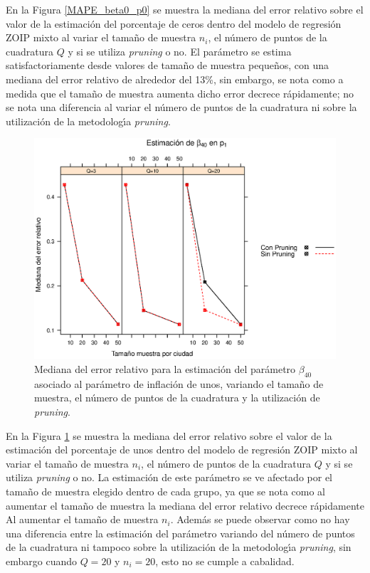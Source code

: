 En la Figura \ref{MAPE_beta0_p0} se muestra la mediana del error relativo sobre el valor de la estimaci\'{o}n del porcentaje de ceros dentro del modelo de regresi\'{o}n ZOIP mixto al variar el tama\~{n}o de muestra $n_i$, el n\'{u}mero de puntos de la cuadratura $Q$ y si se utiliza \textit{pruning} o no. El par\'{a}metro se estima satisfactoriamente desde valores de tama\~{n}o de muestra peque\~{n}os, con una mediana del error relativo de alrededor del 13\%, sin embargo, se nota como a medida que el tama\~{n}o de muestra aumenta dicho error decrece r\'{a}pidamente; no se nota una diferencia al variar el n\'{u}mero de puntos de la cuadratura ni sobre la utilizaci\'{o}n de la metodolog\'{\i}a \textit{pruning}.\\

\begin{figure}
	\begin{center}
		\includegraphics[scale=0.6]{MAPE_beta0_p1.eps}	
		\caption{Mediana del error relativo para la estimaci\'{o}n del par\'{a}metro $\beta_{40}$ asociado al par\'{a}metro de inflaci\'{o}n de unos, variando el tama\~{n}o de muestra, el n\'{u}mero de puntos de la cuadratura y la utilizaci\'{o}n de \textit{pruning}.}
		\label{MAPE_beta0_p1}
	\end{center}
\end{figure}

En la Figura \ref{MAPE_beta0_p1} se muestra la mediana del error relativo sobre el valor de la estimaci\'{o}n del porcentaje de unos dentro del modelo de regresi\'{o}n ZOIP mixto al variar el tama\~{n}o de muestra $n_i$, el n\'{u}mero de puntos de la cuadratura $Q$ y si se utiliza \textit{pruning} o no. La estimaci\'{o}n de este par\'{a}metro se ve afectado por el tama\~{n}o de muestra elegido dentro de cada grupo, ya que se nota como al aumentar el tama\~{n}o de muestra la mediana del error relativo decrece r\'{a}pidamente Al aumentar el tama\~{n}o de muestra $n_i$. Adem\'{a}s se puede observar como no hay una diferencia entre la estimaci\'{o}n del par\'{a}metro variando del n\'{u}mero de puntos de la cuadratura ni tampoco sobre la utilizaci\'{o}n de la metodolog\'{\i}a \textit{pruning}, sin embargo cuando $Q=20$ y $n_i=20$, esto no se cumple a cabalidad.\\

